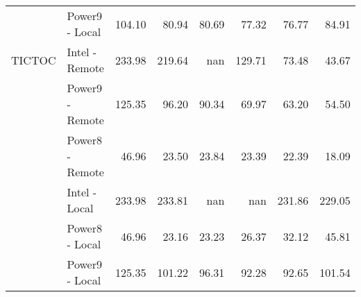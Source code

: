 \begin{tabular}{llrrrrrr}
       & Power9 - Local & 104.10 &  80.94 &  80.69 &  77.32 &  76.77 &  84.91 \\
TICTOC & Intel - Remote & 233.98 & 219.64 &    nan & 129.71 &  73.48 &  43.67 \\
       & Power9 - Remote & 125.35 &  96.20 &  90.34 &  69.97 &  63.20 &  54.50 \\
       & Power8 - Remote &  46.96 &  23.50 &  23.84 &  23.39 &  22.39 &  18.09 \\
       & Intel - Local & 233.98 & 233.81 &    nan &    nan & 231.86 & 229.05 \\
       & Power8 - Local &  46.96 &  23.16 &  23.23 &  26.37 &  32.12 &  45.81 \\
       & Power9 - Local & 125.35 & 101.22 &  96.31 &  92.28 &  92.65 & 101.54 \\
\bottomrule
\end{tabular}
